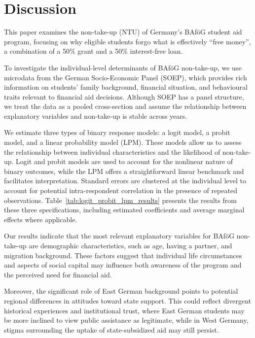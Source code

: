 \section{Discussion}
%
%
This paper examines the non-take-up (NTU) of Germany’s BAföG student aid program, focusing on why eligible students forgo what is effectively ``free money'', a combination of a 50\% grant and a 50\% interest-free loan.

To investigate the individual-level determinants of BAföG non-take-up, we use microdata from the German Socio-Economic Panel (SOEP), which provides rich information on students' family background, financial situation, and behavioural traits relevant to financial aid decisions. 
Although SOEP has a panel structure, we treat the data as a pooled cross-section and assume the relationship between explanatory variables and non-take-up is stable across years.

We estimate three types of binary response models: a logit model, a probit model, and a linear probability model (LPM). 
These models allow us to assess the relationship between individual characteristics and the likelihood of non-take-up. 
Logit and probit models are used to account for the nonlinear nature of binary outcomes, while the LPM offers a straightforward linear benchmark and facilitates interpretation. 
Standard errors are clustered at the individual level to account for potential intra-respondent correlation in the presence of repeated observations.
Table~\ref{tab:logit_probit_lpm_results} presents the results from these three specifications, including estimated coefficients and average marginal effects where applicable.


%
%
Our results indicate that the most relevant explanatory variables for BAföG non-take-up are demographic characteristics, such as age, having a partner, and migration background. 
These factors suggest that individual life circumstances and aspects of social capital may influence both awareness of the program and the perceived need for financial aid.

Moreover, the significant role of East German background points to potential regional differences in attitudes toward state support. 
This could reflect divergent historical experiences and institutional trust, where East German students may be more inclined to view public assistance as legitimate, while in West Germany, stigma surrounding the uptake of state-subsidized aid may still persist.

